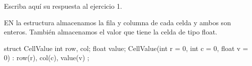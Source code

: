 Escriba aquí su respuesta al ejercicio 1.

EN la estructura almacenamos la fila y columna de cada celda y ambos son enteros.
También almacenamos el valor que tiene la celda de tipo float.

\begin{lslisting}
struct CellValue
{
    int row, col;
    float value;
    CellValue(int r = 0, int c = 0, float v = 0) : row(r), col(c), value(v) {}
};
\end{lslisting}